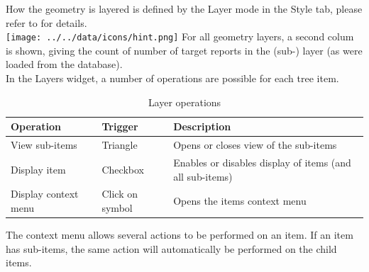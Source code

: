 How the geometry is layered is defined by the Layer mode in the Style tab, please refer to  for details. \\
 
\texttt{[image: ../../data/icons/hint.png]} For all geometry layers, a second colum is shown, giving the count of number of target reports in the (sub-) layer (as were loaded from the database). \\
 
In the Layers widget, a number of operations are possible for each tree item.

\begin{table}[H]
  \center
  \begin{tabular}{ | l | l | l |}
    \hline
    \textbf{Operation} & \textbf{Trigger} &  \textbf{Description} \\ \hline
    View sub-items & Triangle & Opens or closes view of the sub-items \\ \hline
    Display item & Checkbox & Enables or disables display of items (and all sub-items) \\ \hline
    Display context menu & Click on symbol & Opens the items context menu \\ \hline
  \end{tabular}
  \caption{Layer operations}
\end{table}

The context menu allows several actions to be performed on an item. If an item has sub-items, the same action will automatically be performed on the child items.










